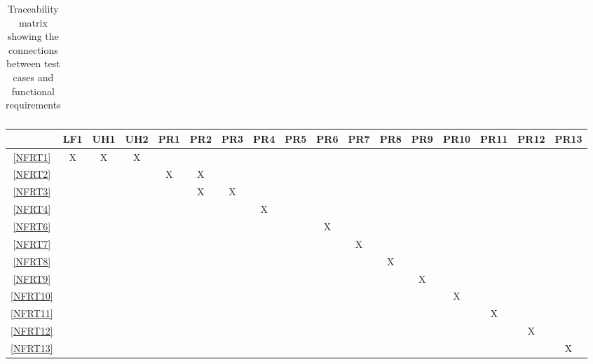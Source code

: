 \documentclass[12pt, titlepage]{article}
\begin{document}
\begin{landscape}
\begin{table}[h!]
\begin{tabular}{|c|c|c|c|c|c|c|c|c|c|c|c|c|c|c|c|c|}
    \end{tabular}
    \caption{Traceability matrix showing the connections between test cases
      and functional requirements}
    \label{tab:frt}
  \end{table}
  \begin{table}[h!]
    \centering
    \begin{tabular}{|c|c|c|c|c|c|c|c|c|c|c|c|c|c|c|c|c|} \hline
                & LF1 & UH1 & UH2 & PR1 & PR2 & PR3 & PR4 & PR5 & PR6 & PR7 & PR8 & PR9 & PR10 & PR11 & PR12 & PR13 \\ \hline
      \ref{NFRT1}  & X   & X   & X   &     &     &     &     &     &     &     &     &     &      &      &      &      \\ \hline
      \ref{NFRT2}  &     &     &     & X   & X   &     &     &     &     &     &     &     &      &      &      &      \\ \hline
      \ref{NFRT3}  &     &     &     &     & X   & X   &     &     &     &     &     &     &      &      &      &      \\ \hline
      \ref{NFRT4}  &     &     &     &     &     &     & X   &     &     &     &     &     &      &      &      &      \\ \hline
      \ref{NFRT6}  &     &     &     &     &     &     &     &     & X   &     &     &     &      &      &      &      \\ \hline
      \ref{NFRT7}  &     &     &     &     &     &     &     &     &     & X   &     &     &      &      &      &      \\ \hline
      \ref{NFRT8}  &     &     &     &     &     &     &     &     &     &     & X   &     &      &      &      &      \\ \hline
      \ref{NFRT9}  &     &     &     &     &     &     &     &     &     &     &     & X   &      &      &      &      \\ \hline
      \ref{NFRT10} &     &     &     &     &     &     &     &     &     &     &     &     & X    &      &      &      \\ \hline
      \ref{NFRT11} &     &     &     &     &     &     &     &     &     &     &     &     &      & X    &      &      \\ \hline
      \ref{NFRT12} &     &     &     &     &     &     &     &     &     &     &     &     &      &      & X    &      \\ \hline
      \ref{NFRT13} &     &     &     &     &     &     &     &     &     &     &     &     &      &      &      & X    \\ \hline

\end{tabular}
\end{table}
\end{landscape}
\end{document}
